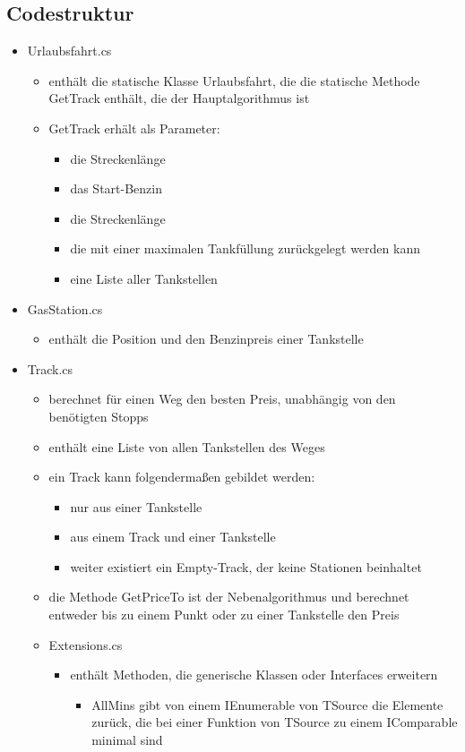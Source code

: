 \documentclass[a4paper,10pt,ngerman]{scrartcl}
\begin{document}
\subsection{Codestruktur}
\begin{itemize}
	\item Urlaubsfahrt.cs
	\begin{itemize}
		\item enthält die statische Klasse Urlaubsfahrt, die die statische Methode GetTrack enthält, die der Hauptalgorithmus ist
		\item GetTrack erhält als Parameter:
		 \begin{itemize}
		 	\item die Streckenlänge
		 	\item das Start-Benzin 
		 	\item die Streckenlänge
		 	\item die mit einer maximalen Tankfüllung zurückgelegt werden kann
		 	\item eine Liste aller Tankstellen
		\end{itemize}
	\end{itemize}
		\item GasStation.cs
	\begin{itemize}
		\item enthält die Position und den Benzinpreis einer Tankstelle
	\end{itemize}
		\item Track.cs
	\begin{itemize}
		\item berechnet für einen Weg den besten Preis, unabhängig von den benötigten Stopps
		\item enthält eine Liste von allen Tankstellen des Weges
		\item ein Track kann folgendermaßen gebildet werden:
		\begin{itemize}
			\item nur aus einer Tankstelle
			\item aus einem Track und einer Tankstelle
			\item weiter existiert ein Empty-Track, der keine Stationen beinhaltet
		\end{itemize}
			\item die Methode GetPriceTo ist der Nebenalgorithmus und berechnet entweder bis zu einem Punkt oder zu einer Tankstelle den Preis
			\item Extensions.cs
		\begin{itemize}
			\item enthält Methoden, die generische Klassen oder Interfaces erweitern
			\begin{itemize}
				\item AllMins gibt von einem IEnumerable von TSource die Elemente zurück, die bei einer Funktion von TSource zu einem IComparable minimal sind
			\end{itemize}
		\end{itemize}
		
	\end{itemize}
\end{itemize}
\end{document}

